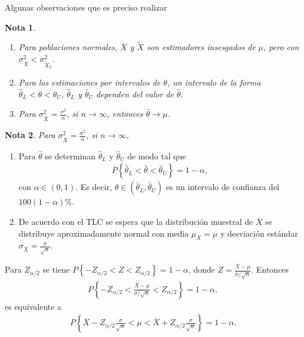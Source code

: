 \documentclass[a4paper]{report} %
\newtheorem{Note}{Nota}[chapter]
\begin{document}
Algunas observaciones que es preciso realizar
\begin{Note}
\begin{enumerate}
\item[a) ]Para poblaciones normales, $\overline{X}$ y $\tilde{X}$ son estimadores insesgados de $\mu$, pero con $\sigma_{\overline{X}}^{2}<\sigma_{\tilde{X}_{2}}^{2}$.

\item[b) ]Para las estimaciones por intervalos de $\theta$, un intervalo de la forma $\hat{\theta}_{L}<\theta<\hat{\theta}_{U}$,  $\hat{\theta}_{L}$ y $\hat{\theta}_{U}$ dependen del valor de $\hat{\theta}$.
\item[c) ]Para $\sigma_{\overline{X}}^{2}=\frac{\sigma^{2}}{n}$, si $n\rightarrow\infty$, entonces $\hat{\theta}\rightarrow\mu$.
\end{enumerate}
\end{Note}


\begin{Note}
Para $\sigma_{\overline{X}}^{2}=\frac{\sigma^{2}}{n}$, si $n\rightarrow\infty$, %
\end{Note}


\begin{enumerate}
\item[d) ]Para $\hat{\theta}$ se determinan $\hat{\theta}_{L}$ y $\hat{\theta}_{U}$ de modo tal que 
\begin{eqnarray}
P\left\{\hat{\theta}_{L}<\hat{\theta}<\hat{\theta}_{U}\right\}=1-\alpha,
\end{eqnarray}
con $\alpha\in\left(0,1\right)$. Es decir, $\theta\in\left(\hat{\theta}_{L},\hat{\theta}_{U}\right)$ es un intervalo de confianza del $100\left(1-\alpha\right)\%$.

\item[e) ] De acuerdo con el TLC se espera que la distribuci\'on muestral de $\overline{X}$ se distribuye aproximadamente normal con media $\mu_{X}=\mu$ y desviaci\'on est\'andar $\sigma_{\overline{X}}=\frac{\sigma}{\sqrt{n}}$.

\end{enumerate}

Para $Z_{\alpha/2}$ se tiene $P\left\{-Z_{\alpha/2}<Z<Z_{\alpha/2}\right\}=1-\alpha$, donde $Z=\frac{\overline{X}-\mu}{\sigma/\sqrt{n}}$. Entonces
\begin{eqnarray}P\left\{-Z_{\alpha/2}<\frac{\overline{X}-\mu}{\sigma/\sqrt{n}}<Z_{\alpha/2}\right\}=1-\alpha,\end{eqnarray} es equivalente a 
\begin{eqnarray}P\left\{\overline{X}-Z_{\alpha/2}\frac{\sigma}{\sqrt{n}}<\mu<\overline{X}+Z_{\alpha/2}\frac{\sigma}{\sqrt{n}}\right\}=1-\alpha.\end{eqnarray}
\end{document}
